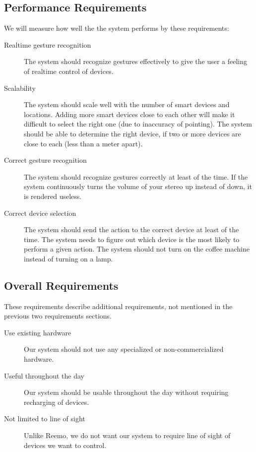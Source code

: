 \subsection{Performance Requirements}
We will measure how well the the system performs by these requirements:
\begin{description}
    \item[Realtime gesture recognition] The system should recognize gestures effectively to give the user a feeling of realtime control of devices. %
    \item[Scalability] The system should scale well with the number of smart devices and locations. Adding more smart devices close to each other will make it difficult to select the right one (due to inaccuracy of pointing). The system should be able to determine the right device, if two or more devices are close to each (less than a meter apart).
    \item[Correct gesture recognition] The system should recognize gestures correctly at least  of the time. If the system continuously turns the volume of your stereo up instead of down, it is rendered useless.  
    \item[Correct device selection] The system should send the action to the correct device at least  of the time. The system needs to figure out which device is the most likely to perform a given action. The system should not turn on the coffee machine instead of turning on a lamp.
\end{description}
    
\subsection{Overall Requirements}
These requirements describe additional requirements, not mentioned in the previous two requirements sections.
\begin{description}
    \item[Use existing hardware] Our system should not use any specialized or non-commercialized hardware.  
    \item[Useful throughout the day] Our system should be usable throughout the day without requiring recharging of devices. 
    \item[Not limited to line of sight] Unlike Reemo, we do not want our system to require line of sight of devices we want to control. 
\end{description}
